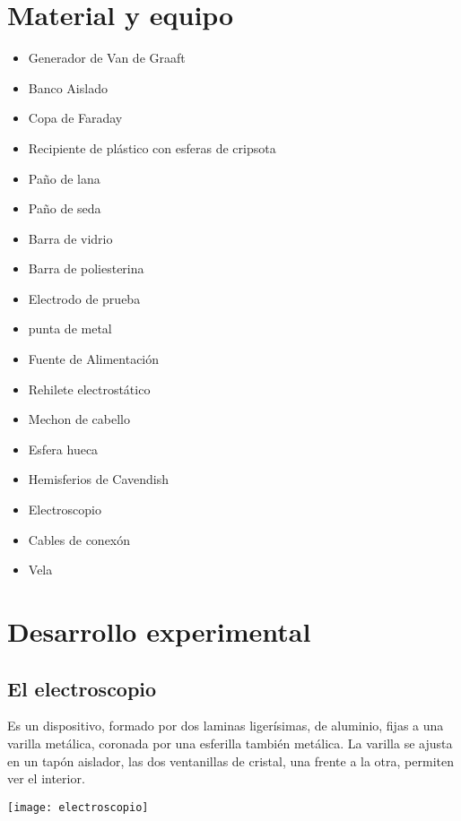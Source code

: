 \documentclass[11pt]{article}
\newenvironment{Figuras}
  {\par\medskip\noindent\minipage{\linewidth}}
  {\endminipage\par\medskip}
\begin{document}
\begin{multicols}{2}
\section{Material y equipo}
	\begin{itemize}

		\item Generador de Van de Graaft
		\item Banco Aislado
		\item Copa de Faraday
		\item Recipiente de plástico con esferas de cripsota
		\item Paño de lana
		\item Paño de seda
		\item Barra de vidrio
		\item Barra de poliesterina
		\item Electrodo de prueba
		\item punta de metal
		\item Fuente de Alimentación
		\item Rehilete electrostático
		\item Mechon de cabello
		\item Esfera hueca
		\item Hemisferios de Cavendish
		\item Electroscopio
		\item Cables de conexón
		\item Vela

	\end{itemize}

\section{Desarrollo experimental}

	\subsection{El electroscopio}
		 Es un dispositivo, formado por dos laminas ligerísimas, de aluminio, fijas a una varilla metálica, coronada por una esferilla también metálica. La varilla se ajusta en un tapón aislador, las dos ventanillas de cristal, una frente a la otra, permiten ver el interior.

\begin{Figuras}
	\centering
    \texttt{[image: electroscopio]}
    \label{fig:mesh1}
\end{Figuras}


\end{multicols}
\end{document}
